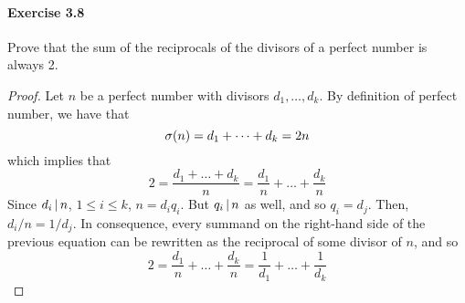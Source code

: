 \paragraph{Exercise 3.8}
Prove that the sum of the reciprocals of the divisors of a perfect number is
always 2.

\begin{proof}
Let $n$ be a perfect number with divisors $d_1,\dots,d_k$. By definition of
perfect number, we have that
$$\sigma(n) = d_1 + \dots + d_k = 2n$$
which implies that 
$$2 = \frac{d_1 + \dots + d_k}{n} = \frac{d_1}{n} + \dots + \frac{d_k}{n}$$
Since $d_i \, | \, n$, $1 \leq i \leq k$, $n = d_i q_i$. But
$q_i \, | \, n$ as well, and so $q_i = d_j$. Then, $d_i / n = 1 / d_j$.
In consequence, every summand on the right-hand side of the previous equation
can be rewritten as the reciprocal of some divisor of $n$, and so
$$2 = \frac{d_1}{n} + \dots + \frac{d_k}{n} = \frac{1}{d_1} + \dots + \frac{1}{d_k}$$

\end{proof}
